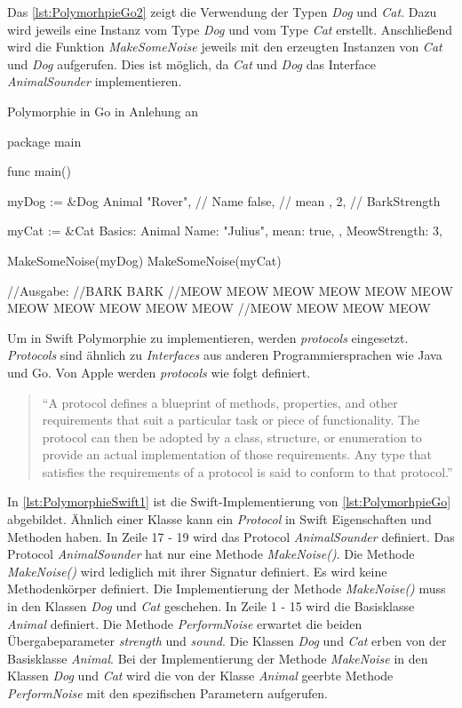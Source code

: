 Das \autoref{lst:PolymorhpieGo2} zeigt die Verwendung der Typen \emph{Dog} und \emph{Cat}.
Dazu wird jeweils eine Instanz vom Type \emph{Dog} und vom Type \emph{Cat} erstellt. 
Anschließend wird die Funktion \emph{MakeSomeNoise} jeweils mit den erzeugten Instanzen von \emph{Cat} und \emph{Dog} aufgerufen. 
Dies ist möglich, da \emph{Cat} und \emph{Dog} das Interface \emph{AnimalSounder} implementieren. 

\begin{listing}[H]
\caption{Polymorphie in Go in Anlehung an \cite[]{WilliamKennedy.2013}}
\label{lst:PolymorhpieGo2}
\begin{GoCode}
package main

func main() {
    myDog := &Dog{
        Animal{
            "Rover", // Name
            false,   // mean
        },
        2, // BarkStrength
    }

    myCat := &Cat{
        Basics: Animal{
            Name: "Julius",
            mean: true,
        },
        MeowStrength: 3,
    }

    MakeSomeNoise(myDog)
    MakeSomeNoise(myCat)
}
//Ausgabe:
//BARK BARK
//MEOW MEOW MEOW MEOW MEOW MEOW MEOW MEOW MEOW MEOW MEOW 
//MEOW MEOW MEOW MEOW
\end{GoCode}
\end{listing}

Um in Swift Polymorphie zu implementieren, werden \textit{protocols} eingesetzt.
\textit{Protocols} sind ähnlich zu \textit{Interfaces} aus anderen Programmiersprachen wie Java und Go.
Von Apple werden \textit{protocols} wie folgt definiert.

\begin{quote}
\enquote{A protocol defines a blueprint of methods, properties, and other requirements that suit a particular
task or piece of functionality. The protocol can then be adopted by a class, structure, or enumeration
to provide an actual implementation of those requirements. Any type that satisfies the requirements of
a protocol is said to conform to that protocol.} \cite[S.341]{Apple.2017}
\end{quote}

In \autoref{lst:PolymorphieSwift1} ist die Swift-Implementierung von \autoref{lst:PolymorhpieGo} abgebildet.
Ähnlich einer Klasse kann ein \textit{Protocol} in Swift Eigenschaften und Methoden haben. 
In Zeile 17 - 19 wird das Protocol \textit{AnimalSounder} definiert. 
Das Protocol \textit{AnimalSounder} hat nur eine Methode \textit{MakeNoise()}. 
Die Methode \textit{MakeNoise()} wird lediglich mit ihrer Signatur definiert. 
Es wird keine Methodenkörper definiert. 
Die Implementierung der Methode \textit{MakeNoise()} muss in den Klassen \textit{Dog} und \textit{Cat} geschehen.
In Zeile 1 - 15 wird die Basisklasse \textit{Animal} definiert. 
Die Methode \textit{PerformNoise} erwartet die beiden Übergabeparameter \textit{strength} und \textit{sound}.
Die Klassen \textit{Dog} und \textit{Cat} erben von der Basisklasse \textit{Animal}.
Bei der Implementierung der Methode \textit{MakeNoise} in den Klassen \textit{Dog} und \textit{Cat} wird die von der Klasse \textit{Animal} geerbte Methode \textit{PerformNoise} mit den spezifischen Parametern aufgerufen.

